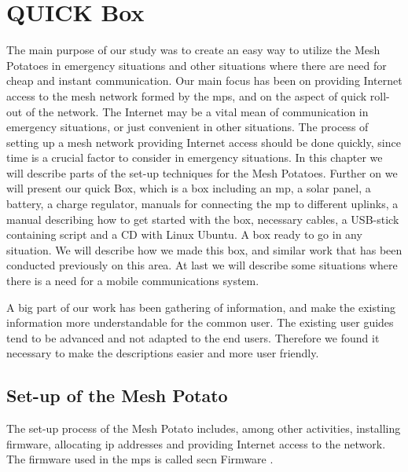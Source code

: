 \chapter{QUICK Box}
\label{chp:quickrollout} 

The main purpose of our study was to create an easy way to utilize the Mesh Potatoes in emergency situations and other situations where there are need for cheap and instant communication. Our main focus has been on providing Internet access to the mesh network formed by the \glspl{mp}, and on the aspect of quick roll-out of the network. The Internet may be a vital mean of communication in emergency situations, or just convenient in other situations. The process of setting up a mesh network providing Internet access should be done quickly, since time is a crucial factor to consider in emergency situations. In this chapter we will describe parts of the set-up techniques for the Mesh Potatoes. Further on we will present our \gls{quick} Box, which is a box including an \gls{mp}, a solar panel, a battery, a charge regulator, manuals for connecting the \gls{mp} to different uplinks, a manual describing how to get started with the box, necessary cables, a USB-stick containing script and a CD with Linux Ubuntu. A box ready to go in any situation. We will describe how we made this box, and similar work that has been conducted previously on this area. At last we will describe some situations where there is a need for a mobile communications system.

A big part of our work has been gathering of information, and make the existing information more understandable for the common user. The existing user guides tend to be advanced and not adapted to the end users. Therefore we found it necessary to make the descriptions easier and more user friendly. 

\section{Set-up of the Mesh Potato}
The set-up process of the Mesh Potato includes, among other activities, installing firmware, allocating \gls{ip} addresses and providing Internet access to the network. The firmware used in the \glspl{mp} is called \gls{secn} Firmware \cite{ChoosingFirmware}. 

